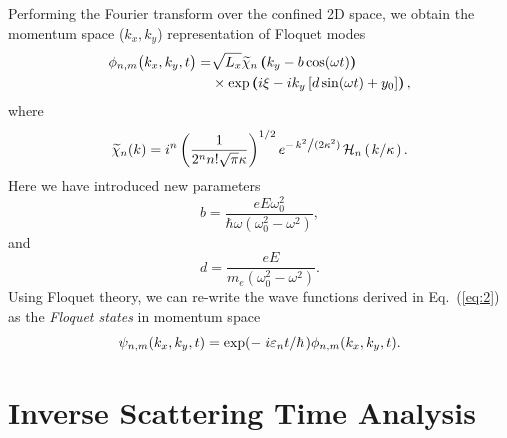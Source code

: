 \documentclass[
 reprint,
 amsmath,amssymb,
 aps,
 prb,
]{revtex4-2}
\begin{document}
Performing the Fourier transform over the confined 2D space, we obtain the momentum space ($k_x,k_y$) representation of Floquet modes
\begin{equation} \label{eq:10}
  \begin{aligned}
    \phi_{n,m}\big(k_x,k_y,t\big)  =&
    \sqrt{L_x}
    \widetilde{\chi}_{n} \bm{\left(}k_y - b\cos(\omega t)\bm{\right) }\\
    & \times
    \exp \bm{\left(} i\xi -ik_y  \left[d\sin(\omega t) + y_0 \right] \bm{\right)},
  \end{aligned}
\end{equation}
where
\begin{equation} \label{eq:11}
  \widetilde{\chi}_{n}(k) =
  i^n \left(\frac{1}{ 2^{n} n! \sqrt{\pi} \kappa}\right)^{1/2}
  e^{-\flatfrac{k^2}{(2 \kappa^2)}}
  \mathcal{H}_{n} \left(\flatfrac{k}{\kappa}\right).
\end{equation}
Here we have introduced new parameters
\begin{equation} \label{eq:12}
  b =
  \frac{eE\omega_0^2}{\hbar\omega(\omega_0^2 - \omega^2)},
\end{equation}
and
\begin{equation} \label{eq:13}
  d =
 \frac{eE}{m_e(\omega_0^2 - \omega^2)}.
\end{equation}
Using Floquet theory, we can re-write the wave functions derived in Eq.~(\ref{eq:2}) as the \textit{Floquet states} in momentum space
\begin{equation} \label{eq:14}
  \psi_{n,m}(k_x,k_y,t) =
  \exp(-\flatfrac{i\varepsilon_{n}t}{\hbar}) \phi_{n,m} (k_x,k_y,t).
\end{equation}

\section{\label{sec_inverse_scattering_time}  Inverse Scattering Time Analysis}
\end{document}
